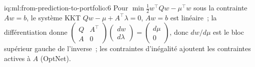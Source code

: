 \begin{solution}{iq:ml:from-prediction-to-portfolio:6}
Pour $\min\frac12w^\top Qw - \mu^\top w$ sous la contrainte $Aw = b$, le système KKT $Qw - \mu + A^\top\lambda = 0$, $Aw = b$ est linéaire~;
la différentiation donne $\begin{pmatrix}Q & A^\top\\ A & 0\end{pmatrix}\begin{pmatrix}dw\\ d\lambda\end{pmatrix} =
\begin{pmatrix}d\mu\\ 0\end{pmatrix}$, donc $dw/d\mu$ est le bloc supérieur gauche de l'inverse~; les contraintes d'inégalité ajoutent les
contraintes actives à $A$ (OptNet).
\end{solution}

